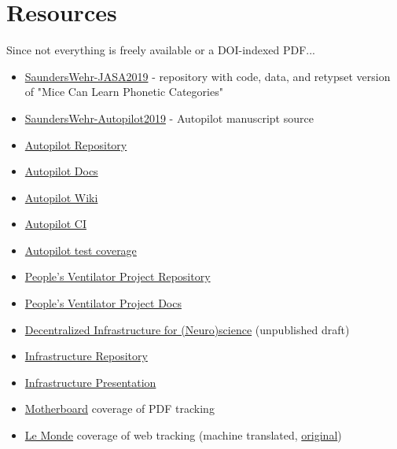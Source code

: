 
\section{Resources}

Since not everything is freely available or a DOI-indexed PDF...

\begin{itemize}
\item \href{https://github.com/wehr-lab/SaundersWehr-JASA2019}{SaundersWehr-JASA2019} - repository with code, data, and retypset version of "Mice Can Learn Phonetic Categories"
\item \href{https://github.com/wehr-lab/SaundersWehr-Autopilot2019}{SaundersWehr-Autopilot2019} - Autopilot manuscript source
\item \href{https://github.com/wehr-lab/autopilot}{Autopilot Repository}
\item \href{https://docs.auto-pi-lot.com}{Autopilot Docs}
\item \href{https://wiki.auto-pi-lot.com}{Autopilot Wiki}
\item \href{https://app.travis-ci.com/github/wehr-lab/autopilot/branches}{Autopilot CI}
\item \href{https://coveralls.io/github/wehr-lab/autopilot}{Autopilot test coverage}
\item \href{https://github.com/CohenLabPrinceton/pvp}{People's Ventilator Project Repository}
\item \href{https://www.peoplesvent.org/en/latest/index.html}{People's Ventilator Project Docs}
\item \href{https://jon-e.net/infrastructure}{Decentralized Infrastructure for (Neuro)science} (unpublished draft)
\item \href{https://github.com/sneakers-the-rat/infrastructure}{Infrastructure Repository}
\item \href{https://jon-e.net/infrastructure-presentation/}{Infrastructure Presentation}
\item \href{https://www.vice.com/en/article/4aw48g/academic-journal-claims-it-fingerprints-pdfs-for-ransomware-not-surveillance}{Motherboard} coverage of PDF tracking
\item \href{https://jon-e.net/img/2022-le-monde-tracking.pdf}{Le Monde} coverage of web tracking (machine translated, \href{https://www.lemonde.fr/sciences/article/2022/01/17/comment-les-editeurs-scientifiques-surveillent-les-chercheurs_6109840_1650684.html}{original})
\end{itemize}